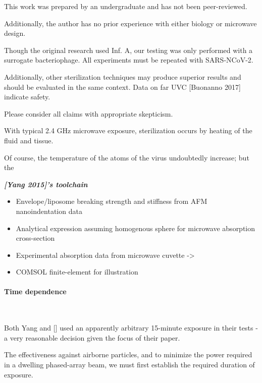 \documentclass[fleqn,10pt]{article}
\begin{document}
	
This work was prepared by an undergraduate and has not been peer-reviewed. 

Additionally, the author has no prior experience with either biology or microwave design. 

Though the original research used Inf. A, our testing was only performed with a surrogate bacteriophage. All experiments must be repeated with SARS-NCoV-2.

Additionally, other sterilization techniques may produce superior results and should be evaluated in the same context. Data on far UVC [Buonanno 2017] indicate safety.

Please consider all claims with appropriate skepticism.


\begin{multicols}{1}


With typical 2.4 GHz microwave exposure, sterilization occurs by heating of the fluid and tissue.

Of course, the temperature of the atoms of the virus undoubtedly increase; but the 

\begin{toolchain}
	{\it \bf [Yang 2015]'s toolchain}
	\begin{itemize}
	\item Envelope/liposome breaking strength and stiffness from AFM nanoindentation data
	\item Analytical expression assuming homogenous sphere for microwave absorption cross-section
	\item Experimental absorption data from microwave cuvette -> 
	\item COMSOL finite-element for illustration
	\end{itemize}
\end{toolchain}

\end{multicols}






\clearpage
\paragraph{\textbf{Time dependence}}\


Both Yang and [] used an apparently arbitrary 15-minute exposure in their tests - a very reasonable decision given the focus of their paper. 

The effectiveness against airborne particles, and to minimize the power required in a dwelling phased-array beam, we must first establish the required duration of exposure.
\end{document}
